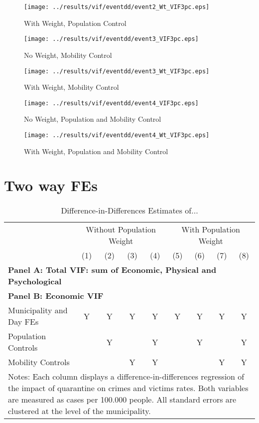\documentclass[11pt,letterpaper]{article}
\begin{document}
\begin{figure}[H]
\caption{With Weight, Population Control}
\centering
\texttt{[image: ../results/vif/eventdd/event2\_Wt\_VIF3pc.eps]}
\end{figure}
\begin{figure}[H]
\caption{No Weight, Mobility Control}
\centering
\texttt{[image: ../results/vif/eventdd/event3\_VIF3pc.eps]}
\end{figure}

\begin{figure}[H]
\caption{With Weight, Mobility Control}
\centering
\texttt{[image: ../results/vif/eventdd/event3\_Wt\_VIF3pc.eps]}
\end{figure}
\begin{figure}[H]
\caption{No Weight, Population and Mobility Control}
\centering
\texttt{[image: ../results/vif/eventdd/event4\_VIF3pc.eps]}
\end{figure}

\begin{figure}[H]
\caption{With Weight, Population and Mobility Control}
\centering
\texttt{[image: ../results/vif/eventdd/event4\_Wt\_VIF3pc.eps]}
\end{figure}

\section{Two way FEs}

\begin{landscape}
  \begin{table}
    \centering
    \caption{Difference-in-Differences Estimates of...} \label{tab:DD}
    \begin{tabular}{lcccccccc} \toprule
      &\multicolumn{4}{c}{Without Population Weight}&\multicolumn{4}{c}{With Population Weight} \\ 
      \cmidrule(r){2-5}\cmidrule(r){6-9}
      &(1)&(2)&(3)&(4)&(5)&(6)&(7)&(8) \\ \midrule
      \multicolumn{9}{l}{\textbf{Panel A: Total VIF: sum of Economic, Physical and Psychological}} \\
       
      \midrule
      \multicolumn{9}{l}{\textbf{Panel B: Economic VIF}} \\
      
      \midrule
      Municipality and Day FEs &Y&Y&Y&Y&Y&Y&Y&Y \\
      Population Controls      & &Y& &Y& &Y& &Y \\
      Mobility Controls        & & &Y&Y& & &Y&Y \\
      \bottomrule
      \multicolumn{9}{p{21.8cm}}{{\footnotesize Notes: Each column displays a difference-in-differences regression of the impact of quarantine on crimes and victims rates. Both variables are measured as cases per 100.000 people.  All standard errors are clustered at the level of the municipality.}}
    \end{tabular}
  \end{table}
\end{landscape}
\end{document}
